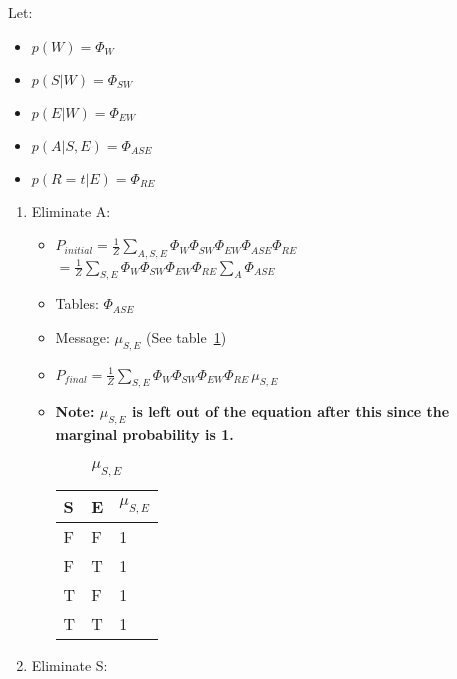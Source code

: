 \documentclass{article}
\begin{document}
\begin{enumerate}[label=(\alph*)]
\begin{enumerate}[label=\roman*.]
Let:
\begin{itemize}
\item $p(W) = \Phi_W$
\item$p(S|W)=\Phi_{SW}$
\item$p(E|W)=\Phi_{EW}$
\item$p(A|S,E)=\Phi_{ASE}$
\item$p(R=t|E)=\Phi_{RE}$
\end{itemize}

\begin{enumerate}[label=\alph*.]


\item Eliminate A:

\begin{itemize}

\item $P_{initial}=\frac{1}{Z}\sum_{A,S,E}\Phi_{W}\Phi_{SW}\Phi_{EW}\Phi_{ASE}\Phi_{RE}$ 
$=\frac{1}{Z}\sum_{S,E}\Phi_{W}\Phi_{SW}\Phi_{EW}\Phi_{RE}\sum_A\Phi_{ASE}$

\item Tables: $\Phi_{ASE}$

\item Message: $\mu_{S,E}$ (See table~\ref{table:tbl11})

\item $P_{final}=\frac{1}{Z}\sum_{S,E}\Phi_{W}\Phi_{SW}\Phi_{EW}\Phi_{RE}\,\mu_{S,E}$ 

\item \textbf{Note:  $\mu_{S,E}$ is left out of the equation after this since the marginal probability is 1.}

\begin{table}[h]
\centering
\caption{$\mu_{S,E}$}
\label{table:tbl11}
\begin{tabular}{|l|l|l|}
\hline
 S & E & $\mu_{S,E}$   \\
\hline \hline
 F & F & 1  \\
 F & T & 1  \\
 T & F & 1  \\
 T & T & 1 \\
\hline
\end{tabular}
\end{table}

\end{itemize}


\item Eliminate S:

\begin{itemize}


\end{itemize}
\end{enumerate}
\end{enumerate}
\end{enumerate}
\end{document}
